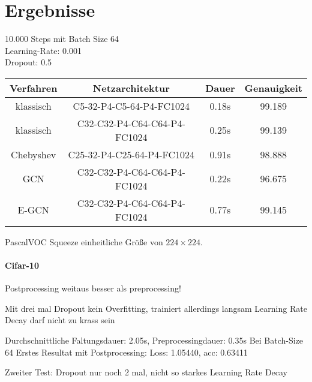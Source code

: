 \section{Ergebnisse}
\label{ergebnisse}

10.000 Steps mit Batch Size 64\\
Learning-Rate: 0.001\\
Dropout: 0.5\\

\begin{tabular}{cccc}
  \toprule
  Verfahren & Netzarchitektur & Dauer & Genauigkeit\\
  \midrule
  klassisch & C5-32-P4-C5-64-P4-FC1024 & 0.18s & 99.189\\
  klassisch & C32-C32-P4-C64-C64-P4-FC1024 & 0.25s & 99.139\\
  Chebyshev & C25-32-P4-C25-64-P4-FC1024 & 0.91s & 98.888\\
  GCN & C32-C32-P4-C64-C64-P4-FC1024 & 0.22s & 96.675\\
  E-GCN & C32-C32-P4-C64-C64-P4-FC1024 & 0.77s & 99.145\\
  \bottomrule
\end{tabular}


PascalVOC Squeeze einheitliche Größe von $224 \times 224$.

\paragraph{\gls{Cifar}-10}

Postprocessing weitaus besser als preprocessing!

Mit drei mal Dropout kein Overfitting, trainiert allerdings langsam
Learning Rate Decay darf nicht zu krass sein

Durchschnittliche Faltungsdauer: 2.05s, Preprocessingdauer: 0.35s
Bei Batch-Size 64
Erstes Resultat mit Postprocessing:
Loss: 1.05440, acc: 0.63411

Zweiter Test:
Dropout nur noch 2 mal, nicht so starkes Learning Rate Decay
